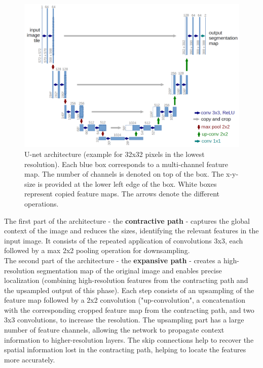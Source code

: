 \begin{figure}[H]
    \centering
    \includegraphics[scale=0.25]{images/u-net-architecture.png}
    \caption{U-net architecture (example for 32x32 pixels in the lowest resolution). Each blue box corresponds to a multi-channel feature map. The number of channels is denoted on top of the box. The x-y-size is provided at the lower left edge of the box. White boxes represent copied feature maps. The arrows denote the different operations.}
    \label{fig:u-net-architecture}
\end{figure}

The first part of the architecture - the \textbf{contractive path} - captures the global context of the image and reduces the sizes, identifying the relevant features in the input image. It consists of the repeated application of convolutions 3x3, each followed by a max 2x2 pooling operation for downsampling.\\

The second part of the architecture - the \textbf{expansive path} - creates a high-resolution segmentation map of the original image and enables precise localization (combining high-resolution features from the contracting path and the upsampled output of this phase). Each step consists of an upsampling of the feature map followed by a 2x2 convolution ("up-convolution", a concatenation with the corresponding cropped feature map from the contracting path, and two 3x3 convolutions, to increase the resolution. The upsampling part has a large number of feature channels, allowing the network to propagate context information to higher-resolution layers. The skip connections help to recover the spatial information lost in the contracting path, helping to locate the features more accurately.\\

